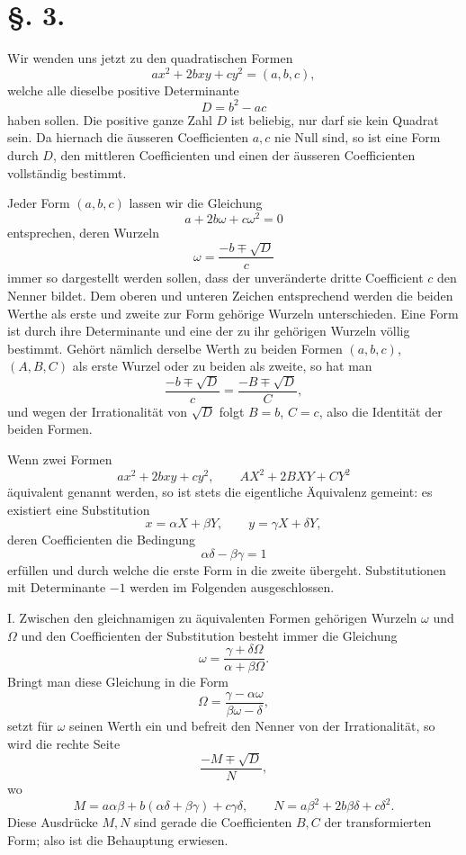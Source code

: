 \documentclass[11pt]{article}
\begin{document}
\section*{\S. 3.}

Wir wenden uns jetzt zu den quadratischen Formen
\[
  ax^2+2bxy+cy^2=(a,b,c),
\]
welche alle dieselbe positive Determinante
\[
  D=b^2-ac
\]
haben sollen. Die positive ganze Zahl $D$ ist beliebig, nur darf sie kein Quadrat sein. Da hiernach die äusseren Coefficienten $a,c$ nie Null sind, so ist eine Form durch $D$, den mittleren Coefficienten und einen der äusseren Coefficienten vollständig bestimmt.

Jeder Form $(a,b,c)$ lassen wir die Gleichung
\[
 a+2b\omega+c\omega^2=0
\]
entsprechen, deren Wurzeln
\[
 \omega=\frac{-b\mp\sqrt D}{c}
\]
immer so dargestellt werden sollen, dass der unveränderte dritte Coefficient $c$ den Nenner bildet. Dem oberen und unteren Zeichen entsprechend werden die beiden Werthe als erste und zweite zur Form gehörige Wurzeln unterschieden. Eine Form ist durch ihre Determinante und eine der zu ihr gehörigen Wurzeln völlig bestimmt. Gehört nämlich derselbe Werth zu beiden Formen $(a,b,c)$, $(A,B,C)$ als erste Wurzel oder zu beiden als zweite, so hat man
\[
 \frac{-b\mp\sqrt D}{c}=\frac{-B\mp\sqrt D}{C},
\]
und wegen der Irrationalität von $\sqrt D$ folgt $B=b$, $C=c$, also die Identität der beiden Formen.

Wenn zwei Formen
\[
 ax^2+2bxy+cy^2,
 \qquad
 AX^2+2BXY+CY^2
\]
äquivalent genannt werden, so ist stets die eigentliche Äquivalenz gemeint: es existiert eine Substitution
\[
 x=\alpha X+\beta Y,
 \qquad
 y=\gamma X+\delta Y,
\]
deren Coefficienten die Bedingung
\[
 \alpha\delta-\beta\gamma=1
\]
erfüllen und durch welche die erste Form in die zweite übergeht. Substitutionen mit Determinante $-1$ werden im Folgenden ausgeschlossen.

I. Zwischen den gleichnamigen zu äquivalenten Formen gehörigen Wurzeln $\omega$ und $\Omega$ und den Coefficienten der Substitution besteht immer die Gleichung
\[
 \omega=\frac{\gamma+\delta\Omega}{\alpha+\beta\Omega}.
\]
Bringt man diese Gleichung in die Form
\[
 \Omega=\frac{\gamma-\alpha\omega}{\beta\omega-\delta},
\]
setzt für $\omega$ seinen Werth ein und befreit den Nenner von der Irrationalität, so wird die rechte Seite
\[
 \frac{-M\mp\sqrt D}{N},
\]
wo
\[
 M=a\alpha\beta+b(\alpha\delta+\beta\gamma)+c\gamma\delta,
\qquad
 N=a\beta^2+2b\beta\delta+c\delta^2.
\]
Diese Ausdrücke $M,N$ sind gerade die Coefficienten $B,C$ der transformierten Form; also ist die Behauptung erwiesen.
\end{document}
